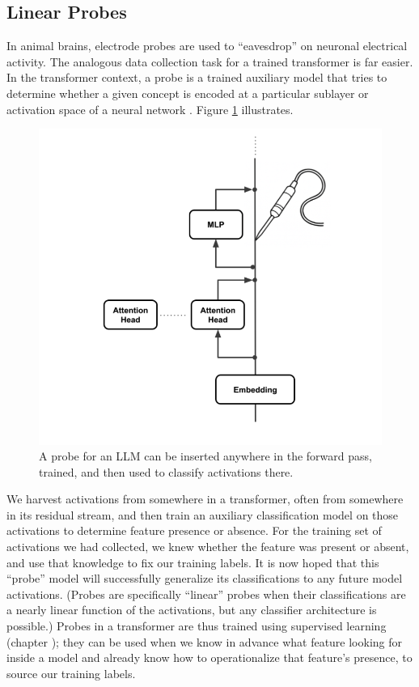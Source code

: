 \subsection{Linear Probes}

In animal brains, electrode probes are used to ``eavesdrop'' on neuronal
electrical activity. The analogous data collection task for a trained
transformer is far easier. In the transformer context, a probe is a trained
auxiliary model that tries to determine whether a given concept is encoded at a
particular sublayer or activation space of a neural
network \cite{alain2018intermediate, belinkov2021classifiers}. Figure
\ref{linearProbe} illustrates.

\begin{figure}[ht]
\centering
\includegraphics[scale=.5]{./images/linearProbe.png}
\caption[Jeff Yoshimi; the line art for the probe was generated by ChatGPT.]{ A
      probe for an LLM can be inserted anywhere in the forward pass, trained,
      and then used to classify activations there.}
\label{linearProbe}
\end{figure}

We harvest activations from somewhere in a transformer, often from somewhere in
its residual stream, and then train an auxiliary classification model on those
activations to determine feature presence or absence. For the training set of
activations we had collected, we knew whether the feature was present or
absent, and use that knowledge to fix our training labels. It is now hoped that
this ``probe'' model will successfully generalize its classifications to any
future model activations. (Probes are specifically ``linear'' probes when their
classifications are a nearly linear function of the activations, but any
classifier architecture is possible.) Probes in a transformer are thus trained
using supervised learning (chapter ); they can be used
when we know in advance what feature looking for inside a model and already
know how to operationalize that feature's presence, to source our training
labels.

